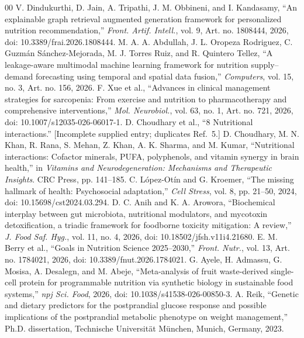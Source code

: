 \documentclass[conference]{IEEEtran}
\begin{document}
\begin{thebibliography}{00}
 V. Dindukurthi, D. Jain, A. Tripathi, J. M. Obbineni, and I. Kandasamy, ``An explainable graph retrieval augmented generation framework for personalized nutrition recommendation,'' \textit{Front. Artif. Intell.}, vol. 9, Art. no. 1808444, 2026, doi: 10.3389/frai.2026.1808444.
 M. A. A. Abdullah, J. L. Oropeza Rodriguez, C. Guzmán Sánchez-Mejorada, M. J. Torres Ruiz, and R. Quintero Tellez, ``A leakage-aware multimodal machine learning framework for nutrition supply--demand forecasting using temporal and spatial data fusion,'' \textit{Computers}, vol. 15, no. 3, Art. no. 156, 2026.
 F. Xue et al., ``Advances in clinical management strategies for sarcopenia: From exercise and nutrition to pharmacotherapy and comprehensive interventions,'' \textit{Mol. Neurobiol.}, vol. 63, no. 1, Art. no. 721, 2026, doi: 10.1007/s12035-026-06017-1.
 D. Choudhary et al., ``8 Nutritional interactions.'' [Incomplete supplied entry; duplicates Ref.~5.]
 D. Choudhary, M. N. Khan, R. Rana, S. Mehan, Z. Khan, A. K. Sharma, and M. Kumar, ``Nutritional interactions: Cofactor minerals, PUFA, polyphenols, and vitamin synergy in brain health,'' in \textit{Vitamins and Neurodegeneration: Mechanisms and Therapeutic Insights}. CRC Press, pp. 141--185.
 C. López-Otín and G. Kroemer, ``The missing hallmark of health: Psychosocial adaptation,'' \textit{Cell Stress}, vol. 8, pp. 21--50, 2024, doi: 10.15698/cst2024.03.294.
 D. C. Anih and K. A. Arowora, ``Biochemical interplay between gut microbiota, nutritional modulators, and mycotoxin detoxification, a triadic framework for foodborne toxicity mitigation: A review,'' \textit{J. Food Saf. Hyg.}, vol. 11, no. 4, 2026, doi: 10.18502/jfsh.v11i4.21680.
 E. M. Berry et al., ``Goals in Nutrition Science 2025--2030,'' \textit{Front. Nutr.}, vol. 13, Art. no. 1784021, 2026, doi: 10.3389/fnut.2026.1784021.
 G. Ayele, H. Admassu, G. Mosisa, A. Desalegn, and M. Abeje, ``Meta-analysis of fruit waste-derived single-cell protein for programmable nutrition via synthetic biology in sustainable food systems,'' \textit{npj Sci. Food}, 2026, doi: 10.1038/s41538-026-00850-3.
 A. Reik, ``Genetic and dietary predictors for the postprandial glucose response and possible implications of the postprandial metabolic phenotype on weight management,'' Ph.D. dissertation, Technische Universität München, Munich, Germany, 2023.

\end{thebibliography}
\end{document}
